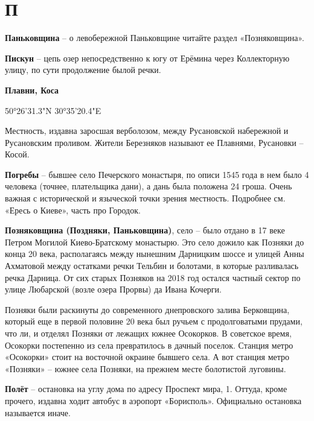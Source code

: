 \chapter*{П}

\textbf{Паньковщина} – о левобережной Паньковщине читайте раздел «Позняковщина».\\

\medskip

\textbf{Пискун} – цепь озер непосредственно к югу от Ерёмина через Коллекторную улицу, по сути продолжение былой речки.\\

\medskip

\textbf{Плавни, Коса}

50°26'31.3"N 30°35'20.4"E

Местность, издавна заросшая верболозом, между Русановской набережной и Русановским проливом. Жители Березняков называют ее Плавнями, Русановки – Косой.\\

\medskip

\textbf{Погребы} – бывшее село Печерского монастыря, по описи 1545 года в нем было 4 человека (точнее, плательщика дани), а дань была положена 24 гроша. Очень важная с исторической и языческой точки зрения местность. Подробнее см. «Ересь о Киеве», часть про Городок.\\

\medskip

\textbf{Позняковщина (Поздняки, Паньковщина)}, село – было отдано в 17 веке Петром Могилой Киево-Братскому монастырю. Это село дожило как Позняки до конца 20 века, располагаясь между нынешним Дарницким шоссе и улицей Анны Ахматовой между остатками речки Тельбин и болотами, в которые разливалась речка Дарница. От сих старых Позняков на 2018 год остался частный сектор по улице Любарской (возле озера Прорвы) да Ивана Кочерги.

Позняки были раскинуты до современного днепровского залива Берковщина, который еще в первой половине 20 века был ручьем с продолговатыми прудами, что ли, и отделял Позняки от лежащих южнее Осокорков. В советское время, Осокорки постепенно из села превратилось в дачный поселок. Станция метро «Осокорки» стоит на восточной окраине бывшего села. А вот станция метро «Позняки» – южнее села Позняки, на прежнем месте болотистой луговины.\\

\medskip


\textbf{Полёт} – остановка на углу дома по адресу Проспект мира, 1. Оттуда, кроме прочего, издавна ходит автобус в аэропорт «Борисполь». Официально остановка называется иначе.\\ 

